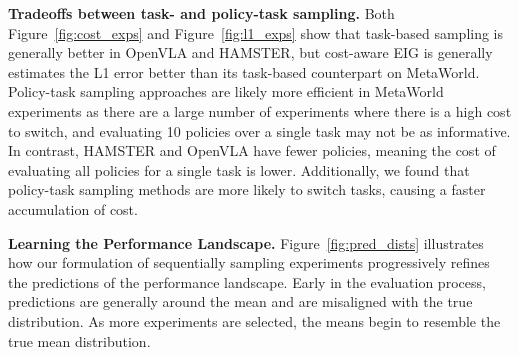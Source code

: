 \textbf{Tradeoffs between task- and policy-task sampling.}
Both Figure~\ref{fig:cost_exps} and Figure~\ref{fig:l1_exps} show that task-based sampling is generally better in OpenVLA and HAMSTER, but cost-aware EIG is generally estimates the L1 error better than its task-based counterpart on MetaWorld.
Policy-task sampling approaches are likely more efficient in MetaWorld experiments as there are a large number of experiments where there is a high cost to switch, and evaluating 10 policies over a single task may not be as informative.
In contrast, HAMSTER and OpenVLA have fewer policies, meaning the cost of evaluating all policies for a single task is lower.
Additionally, we found that policy-task sampling methods are more likely to switch tasks, causing a faster accumulation of cost.



\textbf{Learning the Performance Landscape.}
Figure~\ref{fig:pred_dists} illustrates how our formulation of sequentially sampling experiments progressively refines the predictions of the performance landscape. 
Early in the evaluation process, predictions are generally around the mean and are misaligned with the true distribution.
As more experiments are selected, the means begin to resemble the true mean distribution. 





% 



